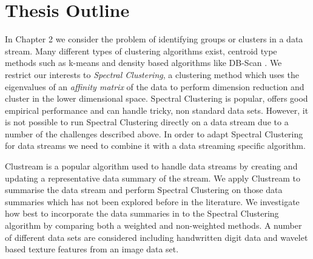 

\section{Thesis Outline}
\label{sec:outline}

In Chapter 2 we consider the problem of identifying groups or clusters in a data stream.  Many different types of clustering algorithms exist, centroid type methods such as k-means \citep{MacQueen1967, Lloyd1982} and density based algorithms like DB-Scan \citep{Ester1996}. We restrict our interests to \textit{Spectral Clustering}, a clustering method which uses the eigenvalues of an \textit{affinity matrix} of the data to perform dimension reduction and cluster in the lower dimensional space. Spectral Clustering is popular, offers good empirical performance and can handle tricky, non standard data sets. However, it is not possible to run Spectral Clustering directly on a data stream due to a number of
the challenges described above. In order to adapt Spectral Clustering for data streams we need to combine it with a data streaming specific algorithm.

Clustream \citep{Aggarwal2003} is a popular algorithm used to handle data streams by creating and updating a representative data summary of the stream. We apply Clustream to summarise the data stream and perform Spectral Clustering on those data summaries which has not been explored before in the literature. We investigate how best to incorporate the data summaries in to the Spectral Clustering algorithm by comparing both a weighted and non-weighted methods. A number of different data sets are considered including handwritten digit data and wavelet based texture features from an image data set.   

